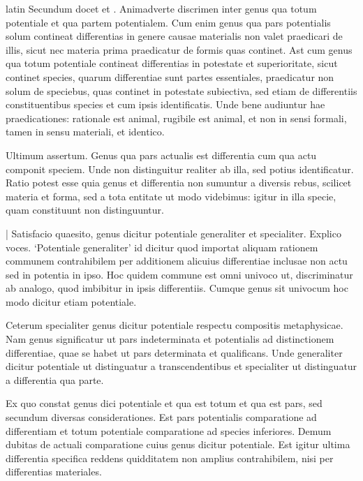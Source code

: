 \begin{otherlanguage*}{latin}
\pstart
Secundum docet  et . Animadverte discrimen inter genus qua totum potentiale et qua partem potentialem. Cum enim genus qua pars potentialis solum contineat differentias in genere causae materialis non valet praedicari de illis, sicut nec materia prima praedicatur de formis quas continet. Ast cum genus qua totum potentiale contineat differentias in potestate et superioritate, sicut continet species, quarum differentiae sunt partes essentiales, praedicatur non solum de speciebus, quas continet in potestate subiectiva, sed etiam de differentiis constituentibus species et cum ipsis identificatis. Unde bene audiuntur hae praedicationes:
rationale est animal, rugibile est animal, et non in sensi formali, tamen in sensu materiali, et identico. 
\pend

\pstart
Ultimum assertum. Genus qua pars actualis est differentia cum qua actu componit speciem. Unde non distinguitur realiter ab illa, sed potius identificatur. Ratio potest esse quia genus et differentia non sumuntur a diversis rebus, scilicet materia et forma, sed a tota entitate ut modo videbimus:
igitur in illa specie, quam constituunt non distinguuntur. 
\pend

\pstart
\textnormal{|} Satisfacio quaesito, genus dicitur potentiale generaliter et specialiter. Explico voces. `Potentiale generaliter' id dicitur quod importat aliquam rationem communem contrahibilem per additionem alicuius differentiae inclusae non actu sed in potentia in ipso. Hoc quidem commune est omni univoco ut, discriminatur ab analogo, quod imbibitur in ipsis differentiis. Cumque genus sit univocum hoc modo dicitur etiam potentiale. 
\pend

\pstart
Ceterum specialiter genus dicitur potentiale respectu compositis metaphysicae. Nam genus significatur ut pars indeterminata et potentialis ad distinctionem differentiae, quae se habet ut pars determinata et qualificans. Unde generaliter dicitur potentiale ut distinguatur a transcendentibus et specialiter ut distinguatur a differentia qua parte. 
\pend

\pstart
Ex quo constat genus dici potentiale et qua est totum et qua est pars, sed secundum diversas considerationes. Est pars potentialis comparatione ad differentiam et totum potentiale comparatione ad species inferiores. Demum dubitas de actuali comparatione cuius genus dicitur potentiale. Est igitur ultima differentia specifica reddens quidditatem non amplius contrahibilem, nisi per differentias materiales. 
\pend


\end{otherlanguage*}
